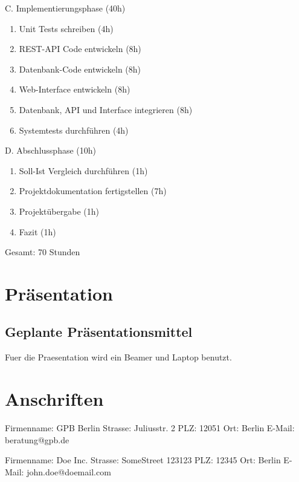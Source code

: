 \documentclass[11pt, a4paper]{article}
\begin{document}
C. Implementierungsphase (40h)
\begin{enumerate}
  \item Unit Tests schreiben (4h)
  \item REST-API Code entwickeln (8h)
  \item Datenbank-Code entwickeln (8h)
  \item Web-Interface entwickeln (8h)
  \item Datenbank, API und Interface integrieren (8h)
  \item Systemtests durchführen (4h)
\end{enumerate}

D. Abschlussphase (10h)
\begin{enumerate}
  \item Soll-Ist Vergleich durchführen (1h)
  \item Projektdokumentation fertigstellen (7h)
  \item Projektübergabe (1h)
  \item Fazit (1h)
\end{enumerate}

Gesamt: 70 Stunden

\section{Pr{\"a}sentation}
\subsection{Geplante Pr{\"a}sentationsmittel}
Fuer die Praesentation wird ein Beamer und Laptop benutzt.

\section{Anschriften}
\newline
Firmenname: GPB Berlin\newline
Strasse: Juliusstr. 2\newline
PLZ: 12051 \newline
Ort: Berlin\newline
E-Mail: beratung@gpb.de\newline

\newline
Firmenname: Doe Inc.\newline
Strasse: SomeStreet 123123\newline
PLZ: 12345\newline
Ort: Berlin\newline
E-Mail: john.doe@doemail.com\newline
\newpage
\end{document}
